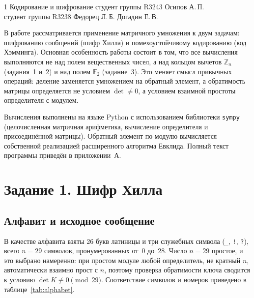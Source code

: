 \documentclass[a4paper,14pt]{extarticle}
\begin{document}
\makegosttitle
  {1}
  {Кодирование и шифрование}
  {студент группы R3243 Осипов А.\,П.\\[4pt]
   студент группы R3238 Федорец Л.\,Б.}
  {Догадин Е.\,В.}

\tableofcontents
\newpage


В работе рассматривается применение матричного умножения к двум задачам: шифрованию
сообщений (шифр Хилла) и помехоустойчивому кодированию (код Хэмминга). Основная
особенность работы состоит в том, что все вычисления выполняются не над полем
вещественных чисел, а над кольцом вычетов $\mathbb{Z}_n$ (задания~1 и~2) и над полем
$\mathbb{F}_2$ (задание~3). Это меняет смысл привычных операций: деление заменяется
умножением на обратный элемент, а обратимость матрицы определяется не условием
$\det \ne 0$, а условием взаимной простоты определителя с модулем.

Вычисления выполнены на языке Python с использованием библиотеки \texttt{sympy}
(целочисленная матричная арифметика, вычисление определителя и присоединённой матрицы).
Обратный элемент по модулю вычисляется собственной реализацией расширенного алгоритма
Евклида. Полный текст программы приведён в приложении~А.

\section{Задание 1. Шифр Хилла}

\subsection{Алфавит и исходное сообщение}

В качестве алфавита взяты 26 букв латиницы и три служебных символа
(\texttt{\_}, \texttt{!}, \texttt{?}), всего $n = 29$ символов, пронумерованных
от~0 до~28. Число $n = 29$ простое, и это выбрано намеренно: при простом модуле
любой определитель, не кратный $n$, автоматически взаимно прост с $n$, поэтому
проверка обратимости ключа сводится к условию $\det K \not\equiv 0 \pmod{29}$.
Соответствие символов и номеров приведено в таблице~\ref{tab:alphabet}.
\end{document}
